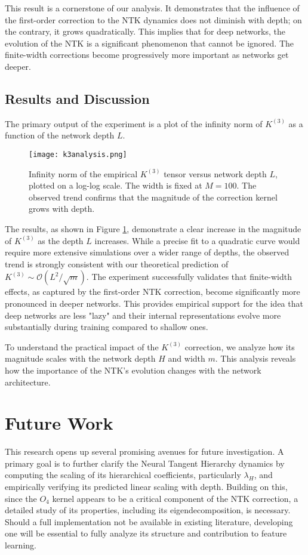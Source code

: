 \documentclass{article}
\newcommand{\Order}{\mathcal{O}}
\begin{document}
This result is a cornerstone of our analysis. It demonstrates that the influence of the first-order correction to the NTK dynamics does not diminish with depth; on the contrary, it grows quadratically. This implies that for deep networks, the evolution of the NTK is a significant phenomenon that cannot be ignored. The finite-width corrections become progressively more important as networks get deeper.



\subsection{Results and Discussion}

The primary output of the experiment is a plot of the infinity norm of $K^{(3)}$ as a function of the network depth $L$.

\begin{figure}[!h]
    \centering
    \texttt{[image: k3analysis.png]}
    \caption{Infinity norm of the empirical $K^{(3)}$ tensor versus network depth $L$, plotted on a log-log scale. The width is fixed at $M=100$. The observed trend confirms that the magnitude of the correction kernel grows with depth.}
    \label{fig:k3_norm_vs_l}
\end{figure}

The results, as shown in Figure \ref{fig:k3_norm_vs_l}, demonstrate a clear increase in the magnitude of $K^{(3)}$ as the depth $L$ increases. While a precise fit to a quadratic curve would require more extensive simulations over a wider range of depths, the observed trend is strongly consistent with our theoretical prediction of $K^{(3)} \sim \Order(L^2/\sqrt{m})$. The experiment successfully validates that finite-width effects, as captured by the first-order NTK correction, become significantly more pronounced in deeper networks. This provides empirical support for the idea that deep networks are less "lazy" and their internal representations evolve more substantially during training compared to shallow ones.


To understand the practical impact of the $K^{(3)}$ correction, we analyze how its magnitude scales with the network depth $H$ and width $m$. This analysis reveals how the importance of the NTK's evolution changes with the network architecture.





\section{Future Work}
This research opens up several promising avenues for future investigation. A primary goal is to further clarify the Neural Tangent Hierarchy dynamics by computing the scaling of its hierarchical coefficients, particularly $\lambda_H$, and empirically verifying its predicted linear scaling with depth. Building on this, since the $O_4$ kernel appears to be a critical component of the NTK correction, a detailed study of its properties, including its eigendecomposition, is necessary. Should a full implementation not be available in existing literature, developing one will be essential to fully analyze its structure and contribution to feature learning.
\end{document}
